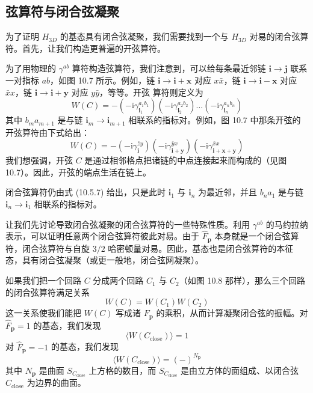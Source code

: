 \subsection{弦算符与闭合弦凝聚}

为了证明 $H_{3D}$ 的基态具有闭合弦凝聚，我们需要找到一个与 $H_{3D}$ 对易的闭合弦算符。首先，让我们构造更普遍的开弦算符。

为了用物理的 $\gamma^{ab}$ 算符构造弦算符，我们注意到，可以给每条最近邻链 $\pmb{i}\to\pmb{j}$ 联系一对指标 $ab$，如图 10.7 所示。例如，链 $\pmb{i}\to\pmb{i}+\pmb{x}$ 对应 $x\bar{x}$，链 $\pmb{i}\to\pmb{i}-\pmb{x}$ 对应 $\bar{x}x$，链 $\pmb{i}\to\pmb{i}+\pmb{y}$ 对应 $y\bar{y}$，等等。开弦
算符则定义为
\begin{equation*}
W(C)=-\left(-\mathrm{i}\gamma_{\pmb{i}_1}^{a_1b_1}\right)\left(-\mathrm{i}\gamma_{\pmb{i}_2}^{a_2b_2}\right)\dots\left(-\mathrm{i}\gamma_{\pmb{i}_n}^{a_nb_n}\right) \tag{10.5.7}
\end{equation*}
其中 $b_ma_{m+1}$ 是与链 $\pmb{i}_m\to\pmb{i}_{m+1}$ 相联系的指标对。例如，图 10.7 中那条开弦的开弦算符由下式给出：
\begin{equation*}
W(C)=-\left(-\mathrm{i}\gamma_{\pmb{i}}^{\bar{z}y}\right)\left(-\mathrm{i}\gamma_{\pmb{i}+\pmb{y}}^{\bar{y}x}\right)\left(-\mathrm{i}\gamma_{\pmb{i}+\pmb{x}+\pmb{y}}^{\bar{x}x}\right)
\end{equation*}
我们想强调，开弦 $C$ 是通过相邻格点把诸链的中点连接起来而构成的（见图 10.7）。因此，开弦的端点生活在链上。

闭合弦算符仍由式 (10.5.7) 给出，只是此时 $\pmb{i}_1$ 与 $\pmb{i}_n$ 为最近邻，并且 $b_na_1$ 是与链 $\pmb{i}_n\to\pmb{i}_1$ 相联系的指标对。

让我们先讨论导致闭合弦凝聚的闭合弦算符的一些特殊性质。利用 $\gamma^{ab}$ 的马约拉纳表示，可以证明任意两个闭合弦算符彼此对易。由于 $\hat F_{\pmb{p}}$ 本身就是一个闭合弦算符，闭合弦算符与自旋 $3/2$ 哈密顿量对易。因此，基态也是闭合弦算符的本征态，具有闭合弦凝聚（或更一般地，闭合弦网凝聚）。

如果我们把一个回路 $C$ 分成两个回路 $C_1$ 与 $C_2$（如图 10.8 那样），那么三个回路的闭合弦算符满足关系
\begin{equation*}
W(C)=W(C_1)W(C_2) \tag{10.5.8}
\end{equation*}
这一关系使我们能把 $W(C)$ 写成诸 $F_{\pmb{p}}$ 的乘积，从而计算凝聚闭合弦的振幅。对 $\hat F_{\pmb{p}}=1$ 的基态，我们发现
\begin{equation*}
\langle W(C_{\text{close}})\rangle=1
\end{equation*}
对 $\hat F_{\pmb{p}}=-1$ 的基态，我们发现
\begin{equation*}
\langle W(C_{\text{close}})\rangle=(-)^{N_{\pmb{p}}}
\end{equation*}
其中 $N_{\pmb{p}}$ 是曲面 $S_{C_{\text{close}}}$ 上方格的数目，而 $S_{C_{\text{close}}}$ 是由立方体的面组成、以闭合弦 $C_{\text{close}}$ 为边界的曲面。

